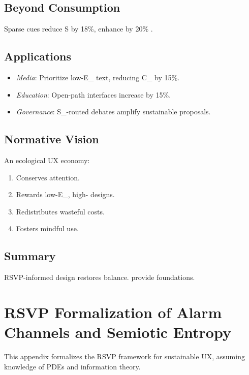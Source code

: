 \documentclass[openany]{book}
\newcommand{\Sent}{S} %
\newcommand{\Eint}{E_{\mathrm{int}}} %
\newcommand{\Cfoot}{C_{\mathrm{foot}}} %
\newcommand{\Auton}{\mathcal{A}} %
\newcommand{\SUX}{S_{\mathrm{UX}}} %
\begin{document}
\section{Beyond Consumption}
\label{sec:vision-beyond}
Sparse cues reduce \Sent{} by 18\%, enhance \Auton{} by 20\% \citep{colak2024}.

\section{Applications}
\label{sec:vision-apps}
\begin{itemize}
  \item \emph{Media}: Prioritize low-\Eint{} text, reducing \Cfoot{} by 15\%.
  \item \emph{Education}: Open-path interfaces increase \Auton{} by 15\%.
  \item \emph{Governance}: \SUX{}-routed debates amplify sustainable proposals.
\end{itemize}

\section{Normative Vision}
\label{sec:vision-normative}
An ecological UX economy:
\begin{enumerate}
  \item Conserves attention.
  \item Rewards low-\Eint{}, high-\Auton{} designs.
  \item Redistributes wasteful costs.
  \item Fosters mindful use.
\end{enumerate}

\section{Summary}
RSVP-informed design restores balance.  provide foundations.

\appendix

\chapter{RSVP Formalization of Alarm Channels and Semiotic Entropy}
\label{app:rsvp}

This appendix formalizes the RSVP framework for sustainable UX, assuming knowledge of PDEs and information theory.
\end{document}
